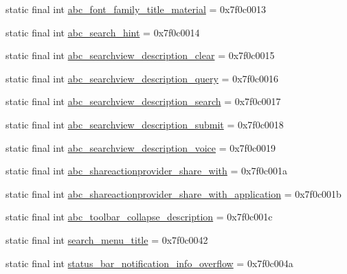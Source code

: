 \begin{DoxyCompactItemize}
\item 
static final int \mbox{\hyperlink{classandroid_1_1support_1_1v7_1_1appcompat_1_1_r_1_1string_ada72478e4c0dd08d9a696a9e0b76c55f}{abc\+\_\+font\+\_\+family\+\_\+title\+\_\+material}} = 0x7f0c0013
\item 
static final int \mbox{\hyperlink{classandroid_1_1support_1_1v7_1_1appcompat_1_1_r_1_1string_a8a977c43ae9b6036b792a424d60ff3ed}{abc\+\_\+search\+\_\+hint}} = 0x7f0c0014
\item 
static final int \mbox{\hyperlink{classandroid_1_1support_1_1v7_1_1appcompat_1_1_r_1_1string_a458a8ba55dea450ed52e936d7fbb4312}{abc\+\_\+searchview\+\_\+description\+\_\+clear}} = 0x7f0c0015
\item 
static final int \mbox{\hyperlink{classandroid_1_1support_1_1v7_1_1appcompat_1_1_r_1_1string_a687a6a0f890080c34188b0570f1ad557}{abc\+\_\+searchview\+\_\+description\+\_\+query}} = 0x7f0c0016
\item 
static final int \mbox{\hyperlink{classandroid_1_1support_1_1v7_1_1appcompat_1_1_r_1_1string_adb0d54ee3eeb2609de19decfc0831c19}{abc\+\_\+searchview\+\_\+description\+\_\+search}} = 0x7f0c0017
\item 
static final int \mbox{\hyperlink{classandroid_1_1support_1_1v7_1_1appcompat_1_1_r_1_1string_ae42251191872922dcd3e42a02b86f36c}{abc\+\_\+searchview\+\_\+description\+\_\+submit}} = 0x7f0c0018
\item 
static final int \mbox{\hyperlink{classandroid_1_1support_1_1v7_1_1appcompat_1_1_r_1_1string_af44447786247cf4c993ba7d749a18d7b}{abc\+\_\+searchview\+\_\+description\+\_\+voice}} = 0x7f0c0019
\item 
static final int \mbox{\hyperlink{classandroid_1_1support_1_1v7_1_1appcompat_1_1_r_1_1string_ada3024d7f8a977c5a49a8cab63c26f27}{abc\+\_\+shareactionprovider\+\_\+share\+\_\+with}} = 0x7f0c001a
\item 
static final int \mbox{\hyperlink{classandroid_1_1support_1_1v7_1_1appcompat_1_1_r_1_1string_acd327651d6f2bbab98396d2967431584}{abc\+\_\+shareactionprovider\+\_\+share\+\_\+with\+\_\+application}} = 0x7f0c001b
\item 
static final int \mbox{\hyperlink{classandroid_1_1support_1_1v7_1_1appcompat_1_1_r_1_1string_a399ac8dfa9600f2c34e5d9f2d3e78edb}{abc\+\_\+toolbar\+\_\+collapse\+\_\+description}} = 0x7f0c001c
\item 
static final int \mbox{\hyperlink{classandroid_1_1support_1_1v7_1_1appcompat_1_1_r_1_1string_a9e8e9a30bc2353e3530f5991216399a4}{search\+\_\+menu\+\_\+title}} = 0x7f0c0042
\item 
static final int \mbox{\hyperlink{classandroid_1_1support_1_1v7_1_1appcompat_1_1_r_1_1string_a7cc8e172b664c63f22e7d64dab601204}{status\+\_\+bar\+\_\+notification\+\_\+info\+\_\+overflow}} = 0x7f0c004a
\end{DoxyCompactItemize}

